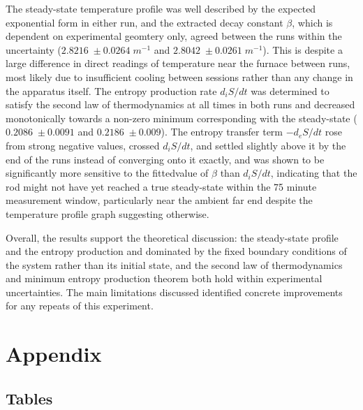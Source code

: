 \documentclass[11pt, a4paper, twocolumn]{article}
\begin{document}
The steady-state temperature profile was well described by the expected exponential form in either run, and the extracted decay constant $\beta$, which is dependent on experimental geomtery only, agreed between the runs within the uncertainty ($2.8216\;\pm 0.0264\; m^{-1}$ and $2.8042\;\pm 0.0261\; m^{-1}$). This is despite a large difference in direct readings of temperature near the furnace between runs, most likely due to insufficient cooling between sessions rather than any change in the apparatus itself. The entropy production rate $d_iS/dt$ was determined to satisfy the second law of thermodynamics at all times in both runs and decreased monotonically towards a non-zero minimum corresponding with the steady-state ($0.2086\;\pm 0.0091$ and $0.2186\;\pm 0.009$). The entropy transfer term $-d_eS/dt$ rose from strong negative values, crossed $d_iS/dt$, and settled slightly above it by the end of the runs instead of converging onto it exactly, and was shown to be significantly more sensitive to the fittedvalue of $\beta$ than $d_iS/dt$, indicating that the rod might not have yet reached a true steady-state within the 75 minute measurement window, particularly near the ambient far end despite the temperature profile graph suggesting otherwise.

Overall, the results support the theoretical discussion: the steady-state profile and the entropy production and dominated by the fixed boundary conditions of the system rather than its initial state, and the second law of thermodynamics and minimum entropy production theorem both hold within experimental uncertainties. The main limitations discussed identified concrete improvements for any repeats of this experiment.




\onecolumn


 \label{sec:ref}

\newpage

\section*{Appendix} \label{sec:A}

\subsection*{Tables}
\end{document}
